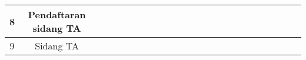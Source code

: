 \documentclass{article}
\begin{document}
\begin{table}
{\begin{tabular}{|c|c|l|l|l|l|l|l|l|l|l|l|l|l|l|l|l|l|l|l|l|l|l|l|}
\hline
8                   & Pendaftaran sidang TA                                                      &                                      &                                      &                                      &                                      &                                      &                                      &                                      &                                      &                                      &                                      &                                      &                                      &                                      &                                      &                                      &                                      &                                      &                                      &                                      &                                      & {\cellcolor[rgb]{0.502,0.502,0.502}} &                                       \\ 
\hline
9                   & Sidang TA                                                                  &                                      &                                      &                                      &                                      &                                      &                                      &                                      &                                      &                                      &                                      &                                      &                                      &                                      &                                      &                                      &                                      &                                      &                                      &                                      &                                      &                                      & {\cellcolor[rgb]{0.502,0.502,0.502}}  \\
\hline
\end{tabular}
}
\end{table}
\end{document}
